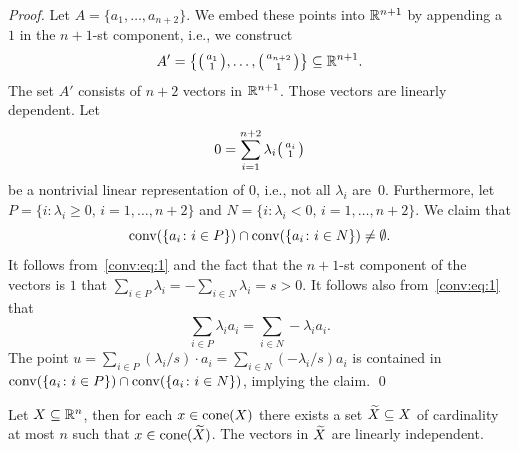 \begin{proof}
  Let $A = \{a_1,\ldots,a_{n+2}\}$. We embed these points into $\mathbb{R}^{n+1}$
  by appending a $1$ in the $n+1$-st component, i.e., we construct 
  \begin{displaymath}
    A' = \left \{ \big(\begin{smallmatrix} a_1\\1 \end{smallmatrix}\big), \ldots,\big(\begin{smallmatrix} a_{n+2}\\1 \end{smallmatrix}\big) \right\}\subseteq\mathbb{R}^{n+1}.
  \end{displaymath}
  The set $A'$ consists of $n+2$ vectors in $\mathbb{R}^{n+1}$. Those vectors
  are linearly dependent.  Let 
  \begin{equation}
    \label{conv:eq:1}
    0= \sum_{i=1}^{n+2} \lambda_i \big(\begin{smallmatrix} a_i\\1 \end{smallmatrix}\big)
  \end{equation}
  be  a nontrivial linear representation of  $0$, i.e., not all $\lambda_i$
  are~$0$.  Furthermore, let $P = \{i \colon \lambda_i \geq0, \, i=1,\ldots,n+2\}$
  and $N = \{i   \colon \lambda_i <0, \, i=1,\ldots,n+2\}$. We claim that
  \begin{displaymath}
      \operatorname{conv}(\{a_i \colon i \in P\}) \cap \operatorname{conv}(\{a_i  \colon i \in N\} ) \neq \emptyset.
  \end{displaymath}
  It follows from~\eqref{conv:eq:1} and the fact that the $n+1$-st
  component of the vectors is $1$  that $\sum_{i \in P} \lambda_i = - \sum_{i \in N}
  \lambda_i  = s >0$. It follows also from~\eqref{conv:eq:1} that 
  \begin{displaymath}
     \sum_{i \in P} \lambda_i a_i = \sum_{i \in N} -\lambda_i a_i.
  \end{displaymath}
  The point $ u = \sum_{i \in P} (\lambda_i / s) \cdot  a_i  = \sum_{i \in N} (-\lambda_i
  /s) a_i $ is contained in $ \operatorname{conv}(\{a_i \colon i \in P\}) \cap \operatorname{conv}(\{a_i
  \colon i \in N\} )$, implying the claim.  \qed
  
\end{proof}


\begin{theorem}
  \label{conv:thr:7}
  Let $X\subseteq\mathbb{R}^n$, then for each $x \in \mathrm{cone}(X)$ there exists a set
  $\widetilde{X}\subseteq X$ of cardinality at most $n$  such that $x \in
  \mathrm{cone}(\widetilde{X})$. The vectors in $\widetilde{X}$ are linearly independent. 
\end{theorem}


